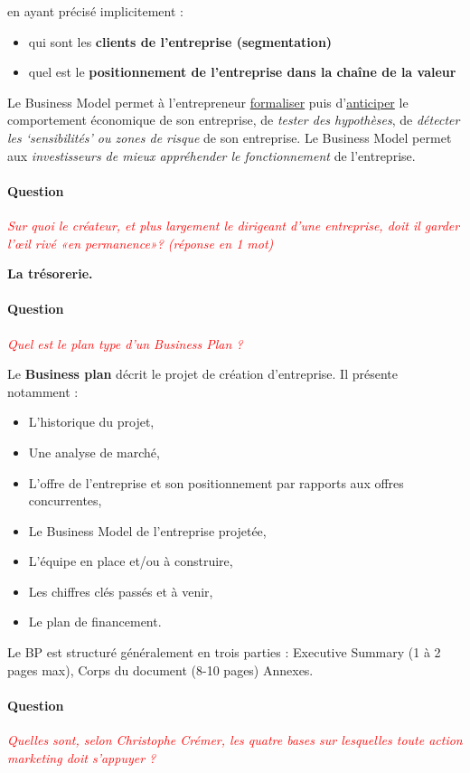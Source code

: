 \documentclass[12pt,oneside,a4paper]{article}
\newcommand{\question}[1]
{
\addtocounter{section}{1}
\paragraph*{Question \thesection}
\emph{\textcolor{red}{#1}}
}
\begin{document}
en ayant précisé implicitement :

\begin{itemize}[label=]
\item qui sont les \textbf{clients de l’entreprise (segmentation)}
\item quel est le \textbf{positionnement de l’entreprise dans la chaîne de la valeur}
\end{itemize}

Le Business Model permet à l’entrepreneur \underline{formaliser} puis d’\underline{anticiper} le comportement économique de son entreprise, de \emph{tester des hypothèses}, de \emph{détecter les `sensibilités' ou zones de risque} de son entreprise.
Le Business Model permet aux \emph{investisseurs de mieux appréhender le fonctionnement} de l’entreprise.

\question{Sur quoi le créateur, et plus largement le dirigeant d’une entreprise, doit il garder l’œil rivé «en permanence»? (réponse en 1 mot)}

\textbf{La trésorerie.}

\question{Quel est le plan type d’un Business Plan ?}

Le \textbf{Business plan} décrit le projet de création d’entreprise. Il présente notamment :

\begin{itemize}[label=]
	\item L’historique du projet,
	\item Une analyse de marché,
	\item L’offre de l’entreprise et son positionnement par rapports aux offres concurrentes,
	\item Le Business Model de l’entreprise projetée,
	\item L’équipe en place et/ou à construire,
	\item Les chiffres clés passés et à venir,
	\item Le plan de financement.	
\end{itemize}

Le BP est structuré généralement en trois parties : Executive Summary (1 à 2 pages max), Corps du document (8-10 pages) Annexes.
\question{Quelles sont, selon Christophe Crémer, les quatre bases sur lesquelles toute action marketing doit s’appuyer ?}
\end{document}

